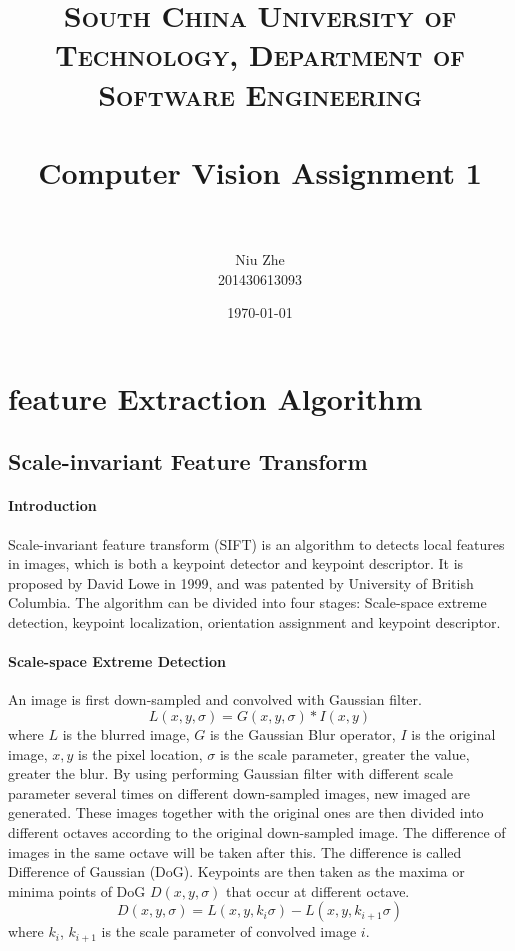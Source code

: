 \documentclass[paper=a4, fontsize=11pt]{scrartcl} %
\title{	
\normalfont \normalsize 
\textsc{South China University of Technology, Department of Software Engineering} \\ [25pt] %
\horrule{0.5pt} \\[0.4cm] %
\huge Computer Vision Assignment 1 \\ %
\horrule{2pt} \\[0.5cm] %
}
\author{Niu Zhe \\201430613093} %
\date{\normalsize\today} %
\numberwithin{equation}{section} %
\numberwithin{figure}{section} %
\numberwithin{table}{section} %
\begin{document}
\maketitle %


\section{feature Extraction Algorithm}


\subsection{Scale-invariant Feature Transform}

\paragraph{Introduction}
Scale-invariant feature transform (SIFT) is an algorithm to detects local features in images, 
which is both a keypoint detector and keypoint descriptor. 
It is proposed by David Lowe in 1999, and was patented by University of British Columbia.
The algorithm can be divided into four stages: 
Scale-space extreme detection, keypoint localization, orientation assignment and keypoint descriptor. 

\paragraph{Scale-space Extreme Detection}
An image is first down-sampled and convolved with Gaussian filter.
$$
L(x, y, \sigma) = G(x, y, \sigma) * I(x, y)
$$
where 
$L$ is the blurred image, 
$G$ is the Gaussian Blur operator, 
$I$ is the original image, 
$x, y$ is the pixel location, 
$\sigma$ is the scale parameter, greater the value, greater the blur.
By using performing Gaussian filter with different scale parameter several times on different down-sampled images, new imaged are generated.
These images together with the original ones are then divided into different octaves according to the original down-sampled image.
The difference of images in the same octave will be taken after this. The difference is called Difference of Gaussian (DoG). 
Keypoints are then taken as the maxima or minima points of DoG $D(x, y, \sigma)$ that occur at different octave.
$$
D(x, y, \sigma) = L(x, y, k_i\sigma) - L(x, y, k_{i+1}\sigma)
$$
where $k_i$, $k_{i+1}$ is the scale parameter of convolved image $i$.
\end{document}
